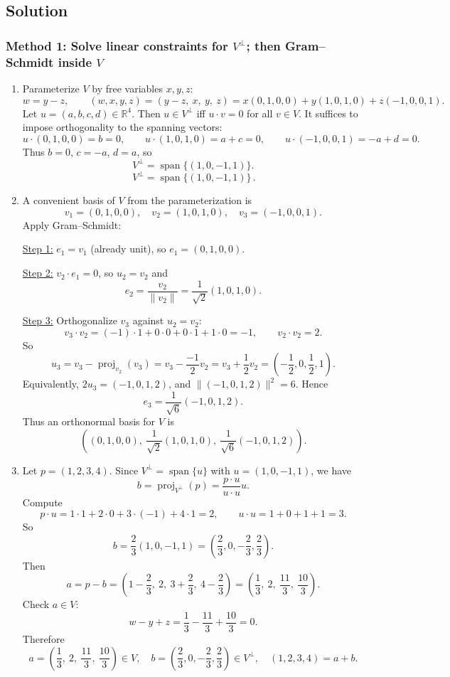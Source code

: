 \documentclass[12pt]{article}
\newcommand{\R}{\mathbb{R}}
\DeclareMathOperator{\Span}{span}
\DeclareMathOperator{\proj}{proj}
\begin{document}
\subsection{Solution}

\subsubsection{Method 1: Solve linear constraints for $V^\perp$; then Gram--Schmidt inside $V$}
\begin{enumerate}[label=(\alph*)]
\item Parameterize $V$ by free variables $x,y,z$:
\[
w=y-z,\qquad (w,x,y,z)=(y-z,\ x,\ y,\ z)=x(0,1,0,0)+y(1,0,1,0)+z(-1,0,0,1).
\]
Let $u=(a,b,c,d)\in\R^4$. Then $u\in V^\perp$ iff $u\cdot v=0$ for all $v\in V$.
It suffices to impose orthogonality to the spanning vectors:
\[
u\cdot(0,1,0,0)=b=0,\qquad
u\cdot(1,0,1,0)=a+c=0,\qquad
u\cdot(-1,0,0,1)=-a+d=0.
\]
Thus $b=0$, $c=-a$, $d=a$, so
\[
V^\perp=\Span\{(1,0,-1,1)\}.
\]
\[
\boxed{\,V^\perp=\Span\{(1,0,-1,1)\}\,}.
\]

\item A convenient basis of $V$ from the parameterization is
\[
v_1=(0,1,0,0),\quad v_2=(1,0,1,0),\quad v_3=(-1,0,0,1).
\]
Apply Gram--Schmidt:

\underline{Step 1:} $e_1=v_1$ (already unit), so $e_1=(0,1,0,0)$.

\underline{Step 2:} $v_2\cdot e_1=0$, so $u_2=v_2$ and
\[
e_2=\frac{v_2}{\|v_2\|}=\frac{1}{\sqrt2}(1,0,1,0).
\]

\underline{Step 3:} Orthogonalize $v_3$ against $u_2=v_2$:
\[
v_3\cdot v_2=(-1)\cdot 1+0\cdot 0+0\cdot 1+1\cdot 0=-1,\qquad v_2\cdot v_2=2.
\]
So
\[
u_3=v_3-\proj_{v_2}(v_3)=v_3-\frac{-1}{2}v_2=v_3+\frac12 v_2=\left(-\frac12,0,\frac12,1\right).
\]
Equivalently, $2u_3=(-1,0,1,2)$, and $\|(-1,0,1,2)\|^2=6$. Hence
\[
e_3=\frac{1}{\sqrt6}(-1,0,1,2).
\]
Thus an orthonormal basis for $V$ is
\[
\boxed{\,
\left(
(0,1,0,0),\ \frac{1}{\sqrt2}(1,0,1,0),\ \frac{1}{\sqrt6}(-1,0,1,2)
\right).
\,}
\]

\item Let $p=(1,2,3,4)$. Since $V^\perp=\Span\{u\}$ with $u=(1,0,-1,1)$, we have
\[
b=\proj_{V^\perp}(p)=\frac{p\cdot u}{u\cdot u}u.
\]
Compute
\[
p\cdot u=1\cdot 1+2\cdot 0+3\cdot(-1)+4\cdot 1=2,\qquad u\cdot u=1+0+1+1=3.
\]
So
\[
b=\frac{2}{3}(1,0,-1,1)=\left(\frac23,0,-\frac23,\frac23\right).
\]
Then
\[
a=p-b=\left(1-\frac23,\ 2,\ 3+\frac23,\ 4-\frac23\right)=\left(\frac13,\ 2,\ \frac{11}{3},\ \frac{10}{3}\right).
\]
Check $a\in V$:
\[
w-y+z=\frac13-\frac{11}{3}+\frac{10}{3}=0.
\]
Therefore
\[
\boxed{\,
a=\left(\frac13,\ 2,\ \frac{11}{3},\ \frac{10}{3}\right)\in V,
\quad
b=\left(\frac23,0,-\frac23,\frac23\right)\in V^\perp,
\quad
(1,2,3,4)=a+b.
\,}
\]
\end{enumerate}
\end{document}
